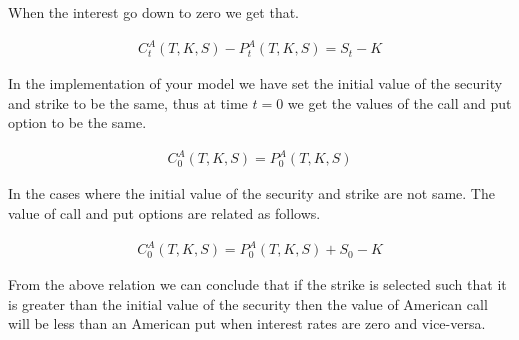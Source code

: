 \documentclass[12pt]{report}
\begin{document}
When the interest go down to zero we get that.

\begin{equation*}
\begin{aligned}
	C^A_t(T,K,S) - P^A_t(T,K,S) = S_t - K
\end{aligned}
\end{equation*}

In the implementation of your model we have set the initial value of the security and strike to be the same, thus at time $t=0$ we get the values of the call and put option to be the same.

\begin{equation*}
\begin{aligned}
C^A_0(T,K,S) = P^A_0(T,K,S)
\end{aligned}
\end{equation*}

In the cases where the initial value of the security and strike are not same. The value of call and put options are related as follows.

\begin{equation*}
	\begin{aligned}
		C^A_0(T,K,S) = P^A_0(T,K,S) + S_0 - K
	\end{aligned}
\end{equation*}

From the above relation we can conclude that if the strike is selected such that it is greater than the initial value of the security then the value of American call will be less than an American put when interest rates are zero and vice-versa. 
\end{document}
